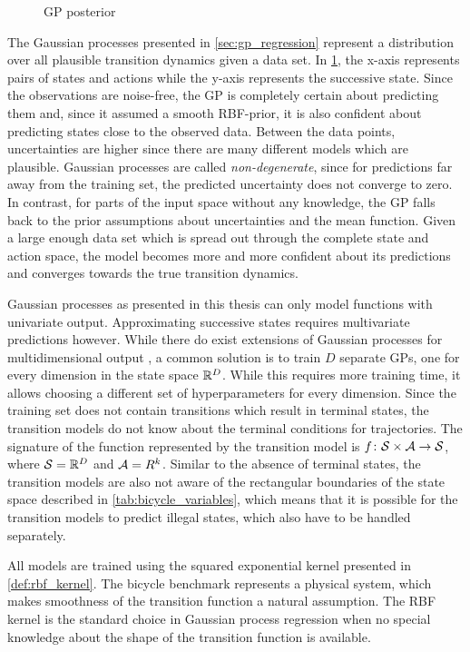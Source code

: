 \begin{figure}[tb]
    \centering
    \caption{GP posterior}
    \label{fig:gp_transition_models}
\end{figure}
The Gaussian processes presented in \cref{sec:gp_regression} represent a distribution over all plausible transition dynamics given a data set.
In \cref{fig:gp_transition_models}, the x-axis represents pairs of states and actions while the y-axis represents the successive state.
Since the observations are noise-free, the GP is completely certain about predicting them and, since it assumed a smooth RBF-prior, it is also confident about predicting states close to the observed data.
Between the data points, uncertainties are higher since there are many different models which are plausible.
Gaussian processes are called \emph{non-degenerate}, since for predictions far away from the training set, the predicted uncertainty does not converge to zero.
In contrast, for parts of the input space without any knowledge, the GP falls back to the prior assumptions about uncertainties and the mean function.
Given a large enough data set which is spread out through the complete state and action space, the model becomes more and more confident about its predictions and converges towards the true transition dynamics.

Gaussian processes as presented in this thesis can only model functions with univariate output.
Approximating successive states requires multivariate predictions however.
While there do exist extensions of Gaussian processes for multidimensional output \cite{rasmussen_gaussian_2006}, a common solution is to train $D$ separate GPs, one for every dimension in the state space $\mathbb{R}^D$.
While this requires more training time, it allows choosing a different set of hyperparameters for every dimension.
Since the training set does not contain transitions which result in terminal states, the transition models do not know about the terminal conditions for trajectories.
The signature of the function represented by the transition model is $f \colon \mathcal{S} \times \mathcal{A} \to \mathcal{S}$, where $\mathcal{S} = \mathbb{R}^D$ and $\mathcal{A} = R^k$.
Similar to the absence of terminal states, the transition models are also not aware of the rectangular boundaries of the state space described in \cref{tab:bicycle_variables}, which means that it is possible for the transition models to predict illegal states, which also have to be handled separately.

All models are trained using the squared exponential kernel presented in \cref{def:rbf_kernel}.
The bicycle benchmark represents a physical system, which makes smoothness of the transition function a natural assumption.
The RBF kernel is the standard choice in Gaussian process regression when no special knowledge about the shape of the transition function is available.

